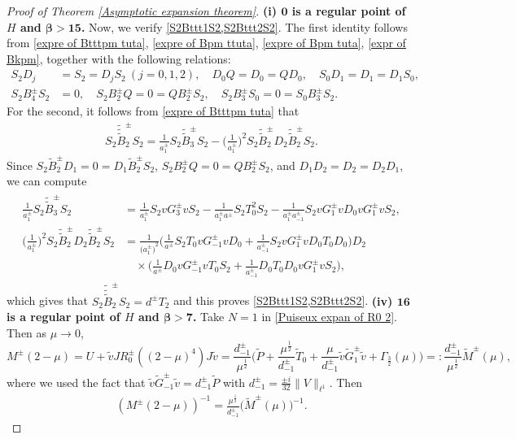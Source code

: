 \documentclass[10pt,a4paper]{amsart}
\numberwithin{equation}{section}
\begin{document}
\begin{proof}[Proof of Theorem {\rm\ref{Asymptotic expansion theorem}}]{\bf{(i) ${\bm{0}}$ is a regular point of $H$ and {$\bm{\beta>15}$}.}}
Now, we verify \eqref{S2Bttt1S2,S2Bttt2S2}. The first identity follows from \eqref{expre of Btttpm tuta}, \eqref{expre of Bpm ttuta}, \eqref{expre of Bpm tuta}, \eqref{expr of Bkpm}, together with the following relations:
\begin{align*}
S_2D_j&=S_2=D_jS_2~(j=0,1,2),\quad D_0Q=D_0=QD_0,\quad  S_0D_1=D_1=D_1S_0,\\
S_2B^{\pm}_4S_2&=0,\quad S_2B^{\pm}_2Q=0=QB^{\pm}_2S_2,\quad S_2B^{\pm}_3S_0=0=S_0B^{\pm}_3S_2.
\end{align*}
For the second, it follows from \eqref{expre of Btttpm tuta} that 
\begin{align*}
S_2\tilde{\tilde{\tilde{B}}}^{\pm}_{2}S_2=\frac{1}{a^{\pm}_1}S_2\tilde{\tilde{B}}^{\pm}_3S_2-\Big(\frac{1}{a^{\pm}_{1}}\Big)^2S_2\tilde{\tilde{B}}^{\pm}_2D_2\tilde{\tilde{B}}^{\pm}_2S_2.
\end{align*}
Since $S_2\widetilde{B}^{\pm}_2D_1=0=D_1\widetilde{B}^{\pm}_2S_2$, $S_2B^{\pm}_2Q=0=QB^{\pm}_2S_2$, and $D_1D_2=D_2=D_2D_1$, we can compute
\begin{align}
\begin{split}
\frac{1}{a^{\pm}_1}S_2\tilde{\tilde{B}}^{\pm}_3S_2&=\frac{1}{a^{\pm}_1}S_2vG^{\pm}_3vS_2-\frac{1}{a^{\pm}_1a^{\pm}}S_2T^2_0S_2-\frac{1}{a^{\pm}_1a^{\pm}_{-1}}S_2vG^{\pm}_1vD_0vG^{\pm}_1vS_2,\\
\Big(\frac{1}{a^{\pm}_{1}}\Big)^2S_2\tilde{\tilde{B}}^{\pm}_2D_2\tilde{\tilde{B}}^{\pm}_2S_2&=\frac{1}{{\big(a^{\pm}_1\big)}^2}\Big(\frac{1}{a^{\pm}}S_2T_0vG^{\pm}_{-1}vD_0+\frac{1}{a^{\pm}_{-1}}S_2vG^{\pm}_1vD_0T_0D_0\Big)D_2\\
&\quad\times\Big(\frac{1}{a^{\pm}}D_0vG^{\pm}_{-1}vT_0S_2+\frac{1}{a^{\pm}_{-1}}D_0T_0D_0vG^{\pm}_1vS_2\Big),
\end{split}
\end{align}
which gives that $S_2\tilde{\tilde{\tilde{B}}}^{\pm}_{2}S_2=d^{\pm}T_2$ and this proves \eqref{S2Bttt1S2,S2Bttt2S2}.
\vskip0.2cm
{\bf{(iv) ${\bm{16}}$ is a regular point of $H$ and {$\bm{\beta>7}$}.}} Take $N=1$ in \eqref{Puiseux expan of R0 2}. Then as $\mu\rightarrow0$,
\begin{equation*}
M^{\pm}(2-\mu)=U+\tilde{v}JR^{\pm}_0((2-\mu)^4)J\tilde{v}
=\frac{d^{\pm}_{-1}}{\mu^{\frac{1}{2}}}\Big(\widetilde{P}+\frac{\mu^{\frac{1}{2}}}{d^{\pm}_{-1}}\widetilde{T}_0+\frac{\mu}{d^{\pm}_{-1}}\tilde{v}\widetilde{G}^{\pm}_{1}\tilde{v}+\Gamma_{\frac{3}{2}}(\mu)\Big)=:\frac{d^{\pm}_{-1}}{\mu^{\frac{1}{2}}}\widetilde{M}^{\pm}(\mu),
\end{equation*}
where we used the fact that $\tilde{v}\widetilde{G}^{\pm}_{-1}\tilde{v}=d^{\pm}_{-1}\widetilde{P}$ with $d^{\pm}_{-1}=\frac{\pm i}{32}\|V\|_{\ell^1}$. Then
\begin{align}\label{Relat of M and M tuta at 2} \left(M^{\pm}(2-\mu)\right)^{-1}=\frac{\mu^{\frac{1}{2}}}{d^{\pm}_{-1}}\big(\widetilde{M}^{\pm}(\mu)\big)^{-1}.
\end{align}


\end{proof}
\end{document}

